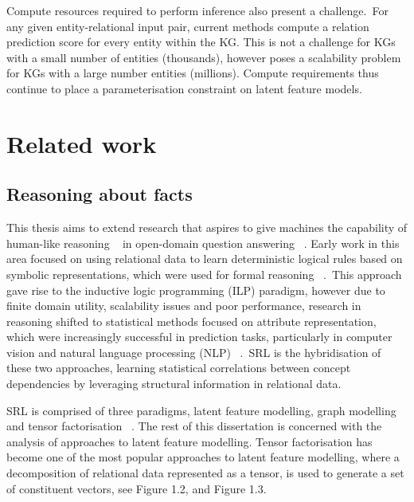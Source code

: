\noindent Compute resources required to perform inference also present a challenge.\ For any given entity-relational input pair, current methods compute a relation prediction score for every entity within the KG. This is not a challenge for KGs with a small number of entities (thousands), however poses a scalability problem for KGs with a large number entities (millions). Compute requirements thus continue to place a parameterisation constraint on latent feature models. 



\section{Related work} %

\subsection{Reasoning about facts} 

\noindent This thesis aims to extend research that aspires to give machines the capability of human-like reasoning \unskip~\citep{bordes2011learning} in open-domain question answering \unskip~\citep{hakimov2019evaluating}. Early work in this area focused on using relational data to learn deterministic logical rules based on symbolic representations, which were used for formal reasoning \unskip~\citep{hohenecker2017deep}.\ This approach gave rise to the inductive logic programming (ILP) paradigm, however due to finite domain utility, scalability issues and poor performance, research in reasoning shifted to statistical methods focused on attribute representation, which were increasingly successful in prediction tasks, particularly in computer vision and natural language processing (NLP) \unskip~\citep{koller2007introduction}.\ SRL is the hybridisation of these two approaches, learning statistical correlations between concept dependencies by leveraging structural information in relational data. \par

\noindent SRL is comprised of three paradigms, latent feature modelling, graph modelling and tensor factorisation \unskip~\citep{nickel2015review}. The rest of this dissertation is concerned with the analysis of approaches to latent feature modelling. Tensor factorisation has become one of the most popular approaches to latent feature modelling, where a decomposition of relational data represented as a tensor, is used to generate a set of constituent vectors, see Figure 1.2, and Figure 1.3. \par

